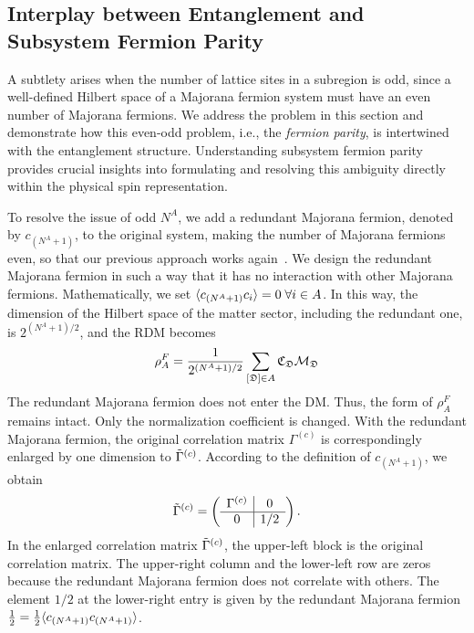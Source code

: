 \subsection{Interplay between Entanglement and Subsystem Fermion Parity}\label{sec:EE-calculation-odd}

A subtlety arises when the number of lattice sites in a subregion is odd, since a well-defined Hilbert space of a Majorana fermion system must have an even number of Majorana fermions. We address the problem in this section and demonstrate how this even-odd problem, i.e., the \textit{fermion parity}, is intertwined with the entanglement structure. Understanding subsystem fermion parity provides crucial insights into formulating and resolving this ambiguity directly within the physical spin representation.

To resolve the issue of odd $N^A$, we add a redundant Majorana fermion, denoted by $c_{(N^A+1)}$, to the original system, making the number of Majorana fermions even, so that our previous approach works again~\cite{Lee-Wilczek_2013}. We design the redundant Majorana fermion in such a way that it has no interaction with other Majorana fermions. Mathematically, we set $\langle  c_{(N^A+1)}c_i \rangle=0\;\forall i\in A$. In this way, the dimension of the Hilbert space of the matter sector, including the redundant one, is $2^{(N^A+1)/2}$, and the RDM becomes
\begin{equation}\label{equ.rho-A-F-odd}
    \rho_A^{F} = \frac{1}{2^{\left( N^A+1 \right)/2}}\sum_{[\mathfrak{D}]\in A}\mathfrak{C}_{\mathfrak{D}}\mathcal{M}_\mathfrak{D}
\end{equation}
The redundant Majorana fermion does not enter the DM. Thus, the form of $\rho^F_A$ remains intact. Only the normalization coefficient is changed. With the redundant Majorana fermion, the original correlation matrix $\Gamma^{(c)}$ is correspondingly enlarged by one dimension to $\Tilde{\Gamma}^{(c)}$. According to the definition of $c_{(N^A+1)}$, we obtain
\begin{equation}\label{equ.tilde-Gamma-corner}
    \Tilde{\Gamma}^{(c)} = 
\left( 
\begin{array}{c|c}
    \Gamma^{(c)} & 0 \\
    \hline
    0 & 1/2
\end{array}
 \right).
\end{equation}
In the enlarged correlation matrix $\Tilde{\Gamma}^{(c)}$, the upper-left block is the original correlation matrix. The upper-right column and the lower-left row are zeros because the redundant Majorana fermion does not correlate with others. The element $1/2$ at the lower-right entry is given by the redundant Majorana fermion $\frac{1}{2}=\frac{1}{2}\langle c_{(N^A+1)}c_{(N^A+1)} \rangle$. 


